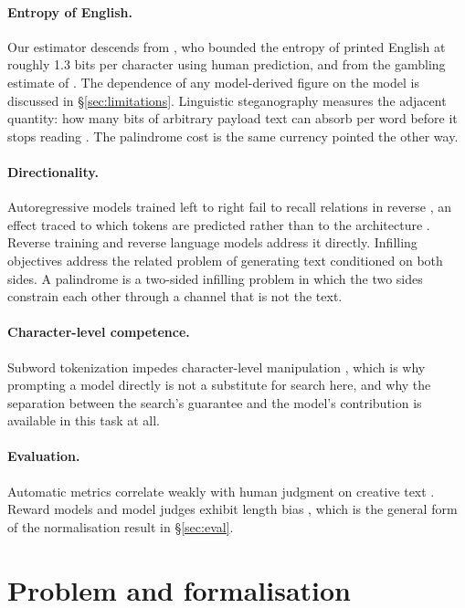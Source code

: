 \documentclass[11pt]{article}
\begin{document}
\paragraph{Entropy of English.}
Our estimator descends from \citet{shannon1951}, who bounded the entropy of
printed English at roughly 1.3 bits per character using human prediction, and
from the gambling estimate of \citet{coverking1978}. The dependence of any
model-derived figure on the model is discussed in \S\ref{sec:limitations}.
Linguistic steganography measures the adjacent quantity: how many bits of
arbitrary payload text can absorb per word before it stops reading
\citep{chang2014}. The palindrome cost is the same currency pointed the other
way.

\paragraph{Directionality.}
Autoregressive models trained left to right fail to recall relations in reverse
\citep{berglund2023}, an effect traced to which tokens are predicted rather
than to the architecture \citep{kitouni2024}. Reverse training
\citep{golovneva2024} and reverse language models \citep{ledom2025} address it
directly. Infilling objectives \citep{bavarian2022,shen2020} address the
related problem of generating text conditioned on both sides. A palindrome is a
two-sided infilling problem in which the two sides constrain each other through
a channel that is not the text.

\paragraph{Character-level competence.}
Subword tokenization impedes character-level manipulation \citep{edman2024},
which is why prompting a model directly is not a substitute for search here,
and why the separation between the search's guarantee and the model's
contribution is available in this task at all.

\paragraph{Evaluation.}
Automatic metrics correlate weakly with human judgment on creative text
\citep{lau2018,potash2016}. Reward models and model judges exhibit length bias
\citep{dubois2024,zheng2023}, which is the general form of the normalisation
result in \S\ref{sec:eval}.

\section{Problem and formalisation}
\label{sec:formalisation}
\end{document}
